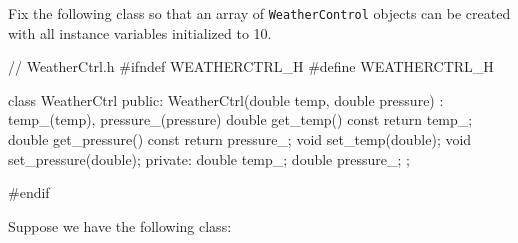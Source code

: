 \begin{ex}
Fix the following class so that an array of
\texttt{WeatherControl} objects can be created with all instance variables
initialized to 10.
\begin{console}
// WeatherCtrl.h
#ifndef WEATHERCTRL_H
#define WEATHERCTRL_H

class WeatherCtrl
{
public:
        WeatherCtrl(double temp, double pressure)
        : temp_(temp), pressure_(pressure)
        {}
        double get_temp() const { return temp_; }
        double get_pressure() const { return pressure_; }
        void set_temp(double);
        void set_pressure(double);
private:
        double temp_;
        double pressure_;
};

#endif
\end{console}
\end{ex}
Suppose we have the following class:

